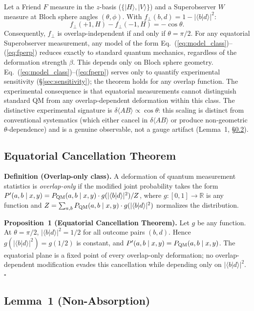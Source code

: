 \documentclass[twocolumn,aps,pra,superscriptaddress,floatfix,10pt]{revtex4-2}
\begin{document}
Let a Friend $F$ measure in the $z$-basis ($\{|H\rangle, |V\rangle\}$) and a Superobserver $W$ measure
at Bloch sphere angles $(\theta, \phi)$. With $f_\perp(b,d) = 1 - |\langle b|d\rangle|^2$:
\begin{equation}
f_\perp(+1, H) - f_\perp(-1, H) = -\cos\theta.
\label{eq:cancel}
\end{equation}
Consequently, $f_\perp$ is overlap-independent if and only if $\theta = \pi/2$. For any
equatorial Superobserver measurement, any model of the form Eq.~(\ref{eq:model_class})--(\ref{eq:fperp}) reduces
exactly to standard quantum mechanics, regardless of the deformation strength $\beta$.
This depends only on Bloch sphere geometry. Eq.~(\ref{eq:model_class})--(\ref{eq:fperp}) serves only to quantify experimental sensitivity (\S\ref{sec:sensitivity});
the theorem holds for any overlap function.
The experimental consequence is that equatorial measurements cannot
distinguish standard QM from any overlap-dependent deformation within this
class. The distinctive experimental signature is $\delta\langle AB\rangle \propto \cos\theta$: this
scaling is distinct from conventional systematics (which either cancel in
$\delta\langle AB\rangle$ or produce non-geometric $\theta$-dependence) and is a genuine observable,
not a gauge artifact (Lemma~1, \S\ref{sec:lemma}).

\subsection{Equatorial Cancellation Theorem}
\label{sec:ect}

\textbf{Definition (Overlap-only class).} A deformation of quantum measurement
statistics is \emph{overlap-only} if the modified joint probability takes the form
$P'(a,b \mid x,y) = P_{\rm QM}(a,b \mid x,y) \cdot g(|\langle b|d\rangle|^2) / Z$, where
$g: [0,1] \to \mathbb{R}$ is any function and $Z = \sum_{a,b} P_{\rm QM}(a,b \mid x,y) \cdot g(|\langle b|d\rangle|^2)$
normalizes the distribution.

\textbf{Proposition~1 (Equatorial Cancellation Theorem).} Let $g$ be any function.
At $\theta = \pi/2$, $|\langle b|d\rangle|^2 = 1/2$ for all outcome pairs $(b,d)$. Hence
$g(|\langle b|d\rangle|^2) = g(1/2)$ is constant, and $P'(a,b \mid x,y) = P_{\rm QM}(a,b \mid x,y)$.
The equatorial plane is a fixed point of every overlap-only deformation;
no overlap-dependent modification evades this cancellation while depending
only on $|\langle b|d\rangle|^2$. $\square$

\subsection{Lemma~1 (Non-Absorption)}
\label{sec:lemma}
\end{document}
